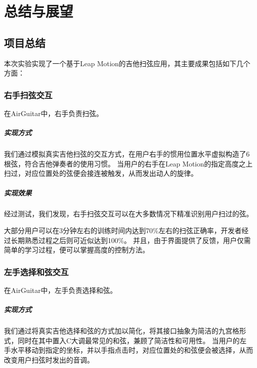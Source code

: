\chapter{总结与展望}

    \section{项目总结}
    本次实验实现了一个基于Leap Motion的吉他扫弦应用，其主要成果包括如下几个方面：

        \subsection{右手扫弦交互}
        在AirGuitar中，右手负责扫弦。

            \paragraph{实现方式} 我们通过模拟真实吉他扫弦的交互方式，在用户右手的惯用位置水平虚拟构造了6根弦，符合吉他弹奏者的使用习惯。
            当用户的右手在Leap Motion的指定高度之上扫过，对应位置处的弦便会接连被触发，从而发出动人的旋律。

            \paragraph{实现效果} 经过测试，我们发现，右手扫弦交互可以在大多数情况下精准识别用户扫过的弦。

            大部分用户可以在3分钟左右的训练时间内达到70\%左右的扫弦正确率，开发者经过长期熟悉过程之后则可近似达到100\%。
            并且，由于界面提供了反馈，用户仅需简单的学习过程，便可以掌握高度的控制方法。

        \subsection{左手选择和弦交互}
        在AirGuitar中，左手负责选择和弦。

            \paragraph{实现方式} 我们通过将真实吉他选择和弦的方式加以简化，将其接口抽象为简洁的九宫格形式，同时在其中置入C大调最常见的和弦，兼顾了简洁性和可用性。
            当用户的左手水平移动到指定的坐标，并以手指点击时，对应位置处的和弦便会被选择，从而改变用户扫弦时发出的音调。

